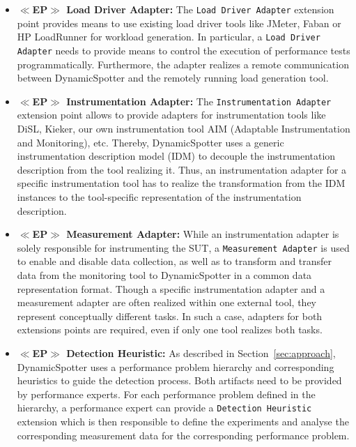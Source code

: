 \documentclass{report}
\newcommand{\DS}{DynamicSpotter }
\begin{document}
\begin{itemize}
  \item \textbf{\(\ll\)EP\(\gg\) Load Driver Adapter:} The \texttt{Load Driver Adapter}
  extension point provides means to use existing load driver tools like JMeter, Faban or HP LoadRunner for workload generation.
  In particular, a \texttt{Load Driver Adapter} needs to provide means to control the execution of performance tests
  programmatically. Furthermore, the adapter realizes a remote communication between \DS and the remotely running load
  generation tool.
  \item \textbf{\(\ll\)EP\(\gg\) Instrumentation Adapter:} The \texttt{Instrumentation Adapter} extension point allows
  to provide adapters for instrumentation tools like DiSL, Kieker, our own instrumentation tool AIM (Adaptable Instrumentation and
Monitoring), etc. Thereby, \DS uses a generic instrumentation description model (IDM) to decouple the instrumentation
description from the tool realizing it. Thus, an instrumentation adapter for a specific instrumentation tool has to
realize the transformation from the IDM instances to the tool-specific representation of the instrumentation
description.
  \item \textbf{\(\ll\)EP\(\gg\) Measurement Adapter:} While an instrumentation adapter is solely responsible for
  instrumenting the SUT, a \texttt{Measurement Adapter} is used to enable and disable data collection, as well as to
  transform and transfer data from the monitoring tool to \DS in a common data representation format. Though a
  specific instrumentation adapter and a measurement adapter are often realized within one external tool, they represent
  conceptually different tasks. In such a case, adapters for both extensions points are required, even if only one tool
  realizes both tasks. 
  \item \textbf{\(\ll\)EP\(\gg\) Detection Heuristic:} As described in Section~\ref{sec:approach}, \DS uses a
  performance problem hierarchy and corresponding heuristics to guide the detection process. Both artifacts need to be
  provided by performance experts. For each performance problem defined in the hierarchy, a performance expert can
  provide a \texttt{Detection Heuristic} extension which is then responsible to define the experiments and analyse the
  corresponding measurement data for the corresponding performance problem. 
\end{itemize}
\end{document}
